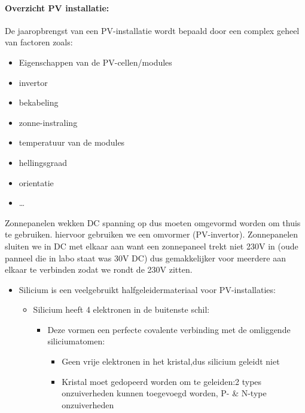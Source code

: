 \documentclass[12pt]{article}
\begin{document}
\paragraph{Overzicht PV installatie:}
De jaaropbrengst van een PV-installatie wordt bepaald door een complex geheel van factoren zoals:\begin{itemize}
    \item Eigenschappen van de PV-cellen/modules 
    \item invertor 
    \item bekabeling
    \item zonne-instraling 
    \item temperatuur van de modules 
    \item hellingsgraad
    \item orientatie 
    \item \dots
\end{itemize}
Zonnepanelen wekken DC spanning op dus moeten omgevormd worden om thuis te gebruiken. hiervoor gebruiken we een omvormer (PV-invertor). Zonnepanelen sluiten we in DC met elkaar aan want een zonnepaneel trekt niet 230V in (oude panneel die in labo staat was 30V DC) dus gemakkelijker voor meerdere aan elkaar te verbinden zodat we rondt de 230V zitten.
\begin{itemize}
    \item Silicium is een veelgebruikt halfgeleidermateriaal voor PV-installaties:\begin{itemize}
        \item Silicium heeft 4 elektronen in de buitenste schil:\begin{itemize}
            \item Deze vormen een perfecte covalente verbinding met de omliggende siliciumatomen:\begin{itemize}
                \item Geen vrije elektronen in het kristal,dus silicium geleidt niet
                \item Kristal moet gedopeerd worden om te geleiden:2 types onzuiverheden kunnen toegevoegd worden, P- \& N-type onzuiverheden
            \end{itemize}
        \end{itemize}
    \end{itemize}
\end{itemize}
\end{document}
